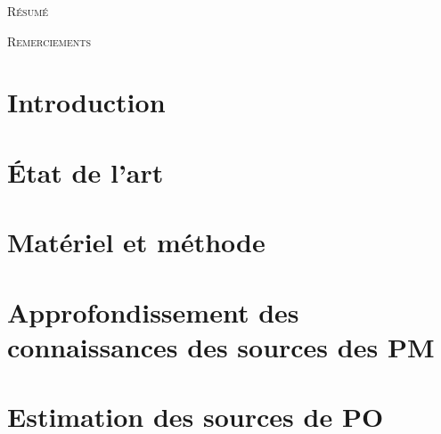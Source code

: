 \documentclass[a4paper,11pt]{book}
\begin{document}


\frontmatter


\begin{center}
    \Huge\textsc{Résumé}
\end{center}

\clearpage

\begin{center}
    \Huge\textsc{Remerciements}
\end{center}


\tableofcontents

\mainmatter

\chapter*{Introduction}

\clearpage

\chapter{État de l'art}
\label{cha:etat_de_lart}
\PartialToc
\clearpage

\clearpage
\printbibliography[segment=\therefsegment,heading=subbibliography]

\chapter{Matériel et méthode}
\label{cha:materiel_et_methode}
\PartialToc
\clearpage

\clearpage
\printbibliography[segment=\therefsegment,heading=subbibliography]

\chapter{Approfondissement des connaissances des sources des PM}%
\label{cha:approfondissement_des_connaissances_des_sources_des_pm}
\PartialToc
\clearpage

\clearpage
\printbibliography[segment=\therefsegment,heading=subbibliography]

\chapter{Estimation des sources de PO}
\label{cha:estimation_des_sources_de_PO}
\PartialToc
\clearpage

\clearpage
\printbibliography[segment=\therefsegment,heading=subbibliography]
\end{document}
